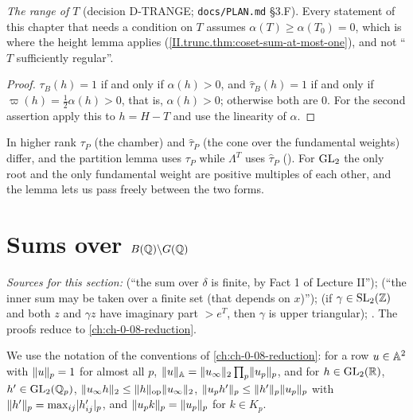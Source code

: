 \emph{The range of $T$} (decision D-TRANGE; \texttt{docs/PLAN.md} §3.F). Every statement of this chapter that needs a condition on $T$ assumes
$\alpha(T)\ge\alpha(T_0)=0$, which is where the height lemma applies (\cref{II.trunc.thm:coset-sum-at-most-one}), and not ``$T$ sufficiently regular''.

\begin{lemma}
\end{lemma}
\begin{proof}
$\tau_B(h)=1$ if and only if $\alpha(h)>0$, and $\hat\tau_B(h)=1$ if and only if $\varpi(h)=\frac12\alpha(h)>0$, that is, $\alpha(h)>0$; otherwise both
are $0$. For the second assertion apply this to $h=H-T$ and use the linearity of $\alpha$.
\end{proof}
\noindent In higher rank $\tau_P$ (the chamber) and $\hat\tau_P$ (the cone over the fundamental weights) differ, and the partition lemma uses $\tau_P$ while
$\Lambda^T$ uses $\hat\tau_P$ (\cite[Lemma~8.2, (13.1)]{AIntro}). For $\mathrm{GL}_2$ the only root and the only fundamental weight are positive multiples of each
other, and the lemma lets us pass freely between the two forms.

\section{Sums over \texorpdfstring{$B(\mathbb{Q})\backslash G(\mathbb{Q})$}{B(Q)\textbackslash G(Q)}}\label{sec:trunc-cosets}

\noindent\emph{Sources for this section:} \cite[Lecture III, after (2.5)]{Gel} (``the sum over $\delta$ is finite, by Fact 1 of Lecture II''); \cite[§13,
after (13.1)]{AIntro} (``the inner sum may be taken over a finite set (that depends on $x$)''); \cite[§8, p.~39, Fig.~8.3]{AIntro} (if $\gamma\in\mathrm{SL}_2(\mathbb{Z})$ and
both $z$ and $\gamma z$ have imaginary part $>e^T$, then $\gamma$ is upper triangular); \cite[Lecture II §2, Fact~1, p.~10; §4, Lemma~4.1, p.~14]{Gel}. The proofs reduce to \cref{ch:ch-0-08-reduction}.

We use the notation of the conventions of \cref{ch:ch-0-08-reduction}: for a row $u\in\mathbb{A}^2$ with $\lVert u\rVert_p=1$ for almost all $p$,
$\lVert u\rVert_{\mathbb{A}}=\lVert u_\infty\rVert_2\prod_p\lVert u_p\rVert_p$, and for $h\in\mathrm{GL}_2(\mathbb{R})$, $h'\in\mathrm{GL}_2(\mathbb{Q}_p)$, $\lVert u_\infty h\rVert_2\le\lVert h\rVert_{\mathrm{op}}\lVert u_\infty\rVert_2$,
$\lVert u_ph'\rVert_p\le\lVert h'\rVert_p\lVert u_p\rVert_p$ with $\lVert h'\rVert_p=\max_{ij}\lvert h'_{ij}\rvert_p$, and $\lVert u_pk\rVert_p=\lVert u_p\rVert_p$ for $k\in K_p$.

